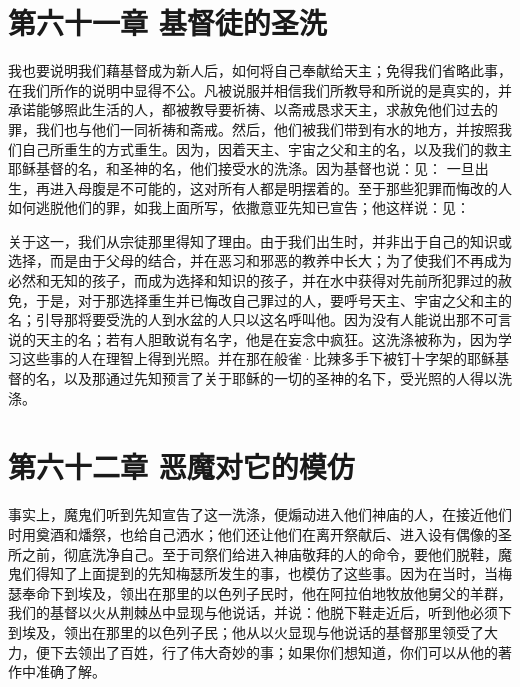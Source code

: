 
\section{第六十一章 基督徒的圣洗}

我也要说明我们藉基督成为新人后，如何将自己奉献给天主；免得我们省略此事，在我们所作的说明中显得不公。凡被说服并相信我们所教导和所说的是真实的，并承诺能够照此生活的人，都被教导要祈祷、以斋戒恳求天主，求赦免他们过去的罪，我们也与他们一同祈祷和斋戒。然后，他们被我们带到有水的地方，并按照我们自己所重生的方式重生。因为，因着天主、宇宙之父和主的名，以及我们的救主耶稣基督的名，和圣神的名，他们接受水的洗涤。因为基督也说：见： 一旦出生，再进入母腹是不可能的，这对所有人都是明摆着的。至于那些犯罪而悔改的人如何逃脱他们的罪，如我上面所写，依撒意亚先知已宣告；他这样说：见：\par

关于这一，我们从宗徒那里得知了理由。由于我们出生时，并非出于自己的知识或选择，而是由于父母的结合，并在恶习和邪恶的教养中长大；为了使我们不再成为必然和无知的孩子，而成为选择和知识的孩子，并在水中获得对先前所犯罪过的赦免，于是，对于那选择重生并已悔改自己罪过的人，要呼号天主、宇宙之父和主的名；引导那将要受洗的人到水盆的人只以这名呼叫他。因为没有人能说出那不可言说的天主的名；若有人胆敢说有名字，他是在妄念中疯狂。这洗涤被称为，因为学习这些事的人在理智上得到光照。并在那在般雀·比辣多手下被钉十字架的耶稣基督的名，以及那通过先知预言了关于耶稣的一切的圣神的名下，受光照的人得以洗涤。\par


\section{第六十二章 恶魔对它的模仿}

事实上，魔鬼们听到先知宣告了这一洗涤，便煽动进入他们神庙的人，在接近他们时用奠酒和燔祭，也给自己洒水；他们还让他们在离开祭献后、进入设有偶像的圣所之前，彻底洗净自己。至于司祭们给进入神庙敬拜的人的命令，要他们脱鞋，魔鬼们得知了上面提到的先知梅瑟所发生的事，也模仿了这些事。因为在当时，当梅瑟奉命下到埃及，领出在那里的以色列子民时，他在阿拉伯地牧放他舅父的羊群，我们的基督以火从荆棘丛中显现与他说话，并说：他脱下鞋走近后，听到他必须下到埃及，领出在那里的以色列子民；他从以火显现与他说话的基督那里领受了大力，便下去领出了百姓，行了伟大奇妙的事；如果你们想知道，你们可以从他的著作中准确了解。\par

